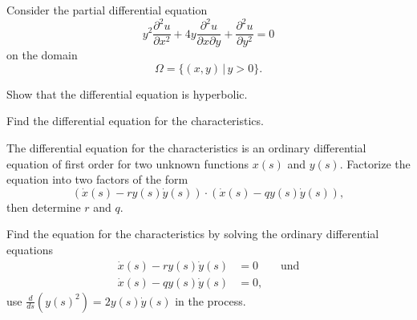 Consider the partial differential equation
\begin{equation}
y^2\frac{\partial^2 u}{\partial x^2}
+4y\frac{\partial^2u}{\partial x\partial y}
+\frac{\partial^2 u}{\partial y^2}=0
\label{90000001:eqn}
\end{equation}
on the domain
\[
\Omega = \{ (x,y)\,|\, y >0\}.
\]
\begin{teilaufgaben}
\item
Show that the differential equation is hyperbolic.
\item
Find the differential equation for the characteristics.
\item
The differential equation for the characteristics is an ordinary
differential equation of first order for two unknown functions
$x(s)$ and $y(s)$.
Factorize the equation into two factors of the form
\[
(\dot x(s)-ry(s)\dot y(s))\cdot (\dot x(s)-qy(s)\dot y(s)),
\]
then determine $r$ and $q$.
\item
Find the equation for the characteristics by solving the ordinary
differential equations
\begin{align*}
\dot x(s) - ry(s)\dot y(s)&=0\qquad\text{und}\\
\dot x(s) - qy(s)\dot y(s)&=0,
\end{align*}
use 
$\frac{d}{ds}(y(s)^2)=2y(s)\dot y(s)$
in the process.
\end{teilaufgaben}

